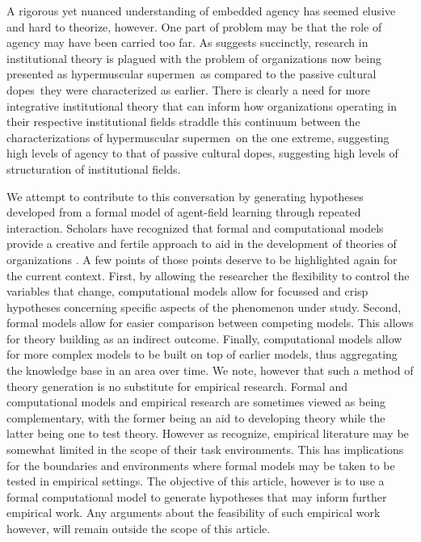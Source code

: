 \documentclass[12pt,letterpaper]{article}
\begin{document}
A rigorous yet nuanced understanding of embedded agency has  seemed elusive and hard to theorize, however. One part of problem may be that the role of agency may have been carried too far. As \cite{Suddaby2010} suggests succinctly,  research in institutional theory is plagued with the problem of organizations now being presented as \textquotesingle hypermuscular supermen\textquotesingle \ as compared to the \textquotesingle passive cultural dopes\textquotesingle \ they were characterized as earlier. There is clearly a need for more integrative institutional theory that can inform how organizations operating in their respective institutional fields straddle this continuum between the characterizations of \textquotesingle hypermuscular supermen\textquotesingle  \ on the one extreme, suggesting high levels of agency to that of \textquotesingle passive cultural dopes\textquotesingle , suggesting high levels of structuration of institutional fields.

We attempt to contribute to this conversation by generating hypotheses developed from a formal model of agent-field learning through repeated interaction. Scholars have recognized that formal and computational models provide a creative and fertile approach to aid in  the development of theories of organizations \citep{Puranam2015}. A few points of those points deserve to be highlighted again for the current context. First, by allowing the researcher the flexibility to control the variables that change, computational models allow for focussed and crisp hypotheses concerning specific aspects of the phenomenon under study. Second, formal models allow for easier comparison between competing models. This allows for theory building as an indirect outcome. Finally, computational models allow for more complex models to be built on top of earlier models, thus aggregating the knowledge base in an area over time. We note, however that such a method of theory generation is no substitute for empirical research. Formal and computational models and empirical research are sometimes viewed as being complementary, with the former being an aid to developing theory while the latter being one to test theory.  However as \cite[p. 376]{Puranam2015} recognize, empirical literature may be somewhat limited in the scope of their task environments. This has implications for the boundaries and environments where formal models may be taken to be tested in empirical settings. The objective of this article, however is to use a formal computational model to generate hypotheses that may inform further empirical work. Any arguments about the feasibility of such empirical work however, will remain outside the scope of this article.
\end{document}
